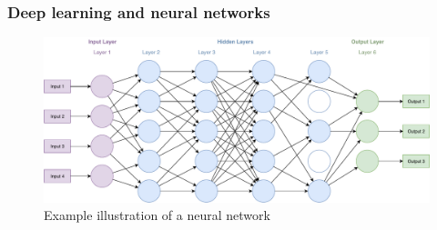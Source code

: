 \documentclass[
a4paper,
pagesize,
pdftex,
12pt,
twoside, %
BCOR=5mm, %
ngerman,
fleqn,
final,
]{scrartcl}
\begin{document}
	\subsubsection{Deep learning and neural networks}\label{Deep-Learning}
	\begin{figure}[ht]
		\centering
		\includegraphics[width=\linewidth]{img/NeuralNetwork}
		\caption{Example illustration of a neural network}
		\label{fig:neuralnetwork}
	\end{figure}
	
\end{document}
